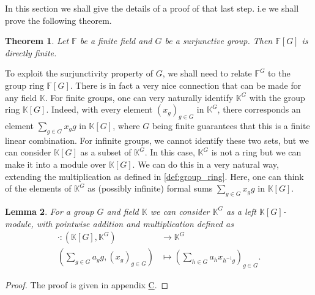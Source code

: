 \documentclass[titlepage, a4paper]{article}
\newcommand{\F}{\mathbb{F}}
\theoremstyle{theoremdd}
\newtheorem{theorem}{Theorem}[section]
\newtheorem{lemma}[theorem]{Lemma}
\theoremstyle{definitiondd}
\theoremstyle{remarkdd}
\newtheorem{remark}[theorem]{Remark}
\begin{document}
	In this section we shall give the details of a proof of that last step. 
	i.e we shall prove the following theorem. 
	\begin{theorem}\label{thm:gottschalk_kaplansky}
		Let $\F$ be a finite field and $G$ be a surjunctive group. Then $\F[G]$ is directly finite. 
	\end{theorem}
	To exploit the surjunctivity property of $G$, we shall need to relate $\mathbb F^G$ to the group ring $\mathbb F[G]$. There is in fact a very nice connection that can be made for any field $\mathbb K$.
	For finite groups, one can very naturally identify $\mathbb K^G$ with the group ring $\mathbb K[G]$. Indeed, with every element $(x_g)_{g \in G}$ in $\mathbb K^G$, there corresponds an element $\sum_{g \in G} x_g g$ in $\mathbb K[G]$, where $G$ being finite guarantees that this is a finite linear combination. For infinite groups, we cannot identify these two sets, but we can consider $\mathbb{K}[G]$ as a subset of $\mathbb K^G$. In this case, $\mathbb K^G$ is not a ring but we can make it into a module over $\mathbb K[G]$. We can do this in a very natural way, extending the multiplication as defined in \cref{def:group_ring}. Here, one can think of the elements of $\mathbb K^G$ as (possibly infinite) formal sums $\sum_{g \in G} x_g g$ in $\mathbb K[G]$.

	\begin{lemma}
		For a group $G$ and field $\mathbb K$ we can consider $\mathbb{K}^{G}$ as a left $\mathbb{K}[G]$-module, with pointwise addition and multiplication defined as
		\begin{align*}
			\cdot : (\mathbb{K}[G] , \mathbb{K}^{G}) &\longrightarrow \mathbb{K}^{G} \\
		\left( \sum_{g \in G} a_g g,  (x_g)_{g \in G}\right)  &\longmapsto \left( \sum_{h \in G} a_h x_{h^{-1}g} \right)_{g \in G}
	.\end{align*} 
	\end{lemma}
	\begin{proof}
		The proof is given in appendix \hyperlink{sec:module}{C}.
	\end{proof}
    
\end{document}
